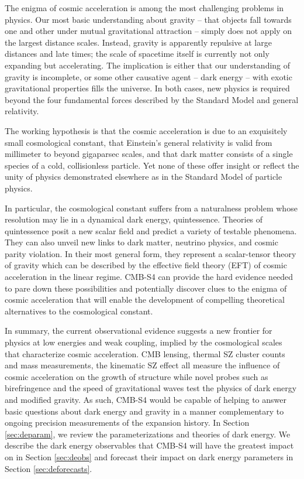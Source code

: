 The enigma of cosmic acceleration is among the most challenging problems in physics. Our most basic understanding about gravity -- that objects fall towards one and other under mutual gravitational attraction -- simply does not apply on the largest distance scales. Instead, gravity is apparently repulsive at large distances and late times; the scale of spacetime itself is currently not only expanding but accelerating. The implication is either that our understanding of gravity is incomplete, or some other causative agent -- dark energy -- with exotic gravitational properties fills the universe. In both cases, new physics is required beyond the four fundamental forces described by the Standard Model and general relativity.

The working hypothesis is that the cosmic acceleration is due to an exquisitely small cosmological constant, that Einstein's general relativity is valid from millimeter to beyond gigaparsec scales, and that dark matter consists of a single species of a cold, collisionless particle. Yet none of these offer insight or reflect the unity of physics demonstrated elsewhere as in the Standard Model of particle physics.

In particular, the cosmological constant suffers from a naturalness problem whose resolution may lie in a dynamical dark energy, quintessence. Theories of quintessence posit a new scalar field and predict a variety of testable phenomena.  They can also unveil new links to dark matter, neutrino physics, and cosmic parity violation. In their most general form, they represent
a scalar-tensor theory of gravity which can be described by  the effective field theory (EFT) of cosmic acceleration in the linear regime. 
CMB-S4 can provide the hard evidence  needed to pare down these possibilities and potentially discover clues to the enigma of cosmic acceleration that will enable the development of  compelling theoretical 
alternatives to the cosmological constant.

In summary, the current observational evidence suggests a new frontier for physics at low energies and weak coupling, implied by the cosmological scales that characterize cosmic acceleration.  CMB lensing, thermal SZ cluster counts and mass measurements,  the kinematic SZ effect  all measure the influence of cosmic acceleration on the growth of 
structure while novel probes such as birefringence and the speed of gravitational waves test the physics of dark energy and modified gravity.   As such, CMB-S4 would be capable of helping to answer basic questions about dark energy and gravity in a manner complementary to ongoing precision measurements of the expansion history.    In Section \ref{sec:deparam}, we review the parameterizations and theories of dark energy.  We describe the 
dark energy observables that CMB-S4 will have the greatest impact on in Section \ref{sec:deobs} and forecast their impact on dark energy 
parameters in Section \ref{sec:deforecasts}.

